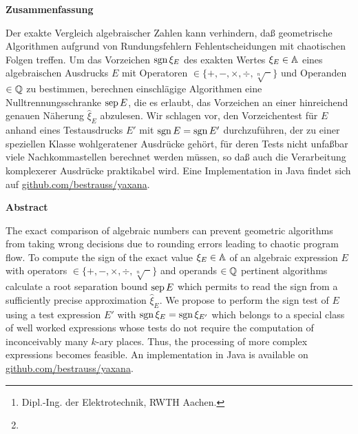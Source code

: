 %
%
\author{\Author\footnote{Dipl.-Ing. der Elektrotechnik, RWTH Aachen.}}
\date{\Date\footnote{\Rev}}
\maketitle
\vfill

\begin{center}
\bf Zusammenfassung
\end{center}

\noindent Der exakte Vergleich algebraischer Zahlen kann verhindern,
daß geometrische Algorithmen
aufgrund von Rundungsfehlern Fehlentscheidungen 
mit chaotischen Folgen treffen.
Um das Vorzeichen $\operatorname{sgn}\xi_E$
des exakten Wertes $\xi_E\in\mathbb{A}$
eines algebraischen Ausdrucks $E$
mit Operatoren $\in\{+, -, \times, \div, \sqrt[n]{\phantom{x}}\}$
und Operanden $\in\mathbb{Q}$ zu bestimmen,
berechnen einschlägige Algorithmen
eine Nulltrennungsschranke $\mathop{\rm sep}\nolimits E$, die es erlaubt,
das Vorzeichen an einer hinreichend genauen
Näherung $\hat{\xi}_E$ abzulesen.
Wir schlagen vor, den Vorzeichentest für $E$ 
anhand eines Testausdrucks 
$E'$ mit $\operatorname{sgn} E=\operatorname{sgn} E'$ durchzuführen,
der zu einer speziellen Klasse wohlgeratener Ausdrücke gehört,
für deren Tests nicht unfaßbar viele Nachkommastellen
berechnet werden müssen,
so daß auch die Verarbeitung komplexerer Ausdrücke praktikabel wird.
Eine Implementation in Java findet sich auf
\href{https://github.com/bestrauss/yaxana}{github.com/bestrauss/yaxana}.


\begin{center}
\bf Abstract
\end{center}

\noindent The exact comparison of algebraic numbers can prevent
geometric algorithms from taking wrong decisions
due to rounding errors leading to chaotic program flow.
To compute the sign of the exact value $\xi_E\in\mathbb{A}$
of an algebraic expression $E$
with operators $\in\{+, -, \times, \div, \sqrt[n]{\phantom{x}}\}$
and operands $\in\mathbb{Q}$
pertinent algorithms calculate a root separation bound $\mathop{\rm sep}\nolimits E$
which permits to read the sign 
from a sufficiently precise approximation $\hat{\xi}_E$.
We propose to perform the sign test of $E$
using a test expression $E'$ with $\operatorname{sgn}\xi_E=\operatorname{sgn}\xi_{E'}$
which belongs to a special class of well worked expressions
whose tests do not require the computation of inconceivably 
many $k$-ary places.
Thus, the processing of more complex expressions 
becomes feasible.
An implementation in Java is available on 
\href{https://github.com/bestrauss/yaxana}{github.com/bestrauss/yaxana}.
\vfill

%
%
